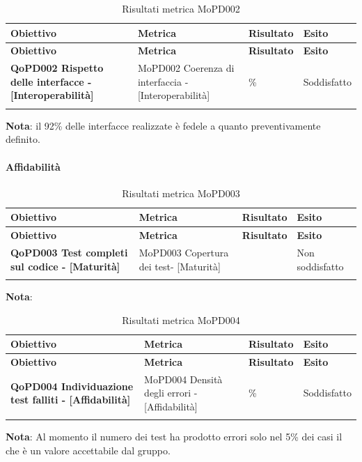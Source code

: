 \renewcommand{\arraystretch}{2} %
\begin{longtable}[H]{>{\centering\bfseries}m{5cm} >{\centering}m{5cm} >{\centering}m{2.5cm} >{\centering\arraybackslash}m{2.5cm}}  
  \rowcolor{lightgray}
  {\textbf{Obiettivo}} & {\textbf{Metrica}} & {\textbf{Risultato}} & {\textbf{Esito}}  \\
  \endfirsthead%
  \rowcolor{lightgray}
  {\textbf{Obiettivo}} & {\textbf{Metrica}} & {\textbf{Risultato}} & {\textbf{Esito}}  \\
  \endhead%
  \textbf{QoPD002 Rispetto delle interfacce - [Interoperabilità]} & MoPD002 Coerenza di interfaccia - [Interoperabilità] & 92\% & Soddisfatto \\
  \caption{Risultati metrica MoPD002}
  \label{tab:my-table}
\end{longtable}
\textbf{Nota}: il 92\% delle interfacce realizzate è fedele a quanto preventivamente definito.

\paragraph{Affidabilità}
\label{sub:affidabilita}

\renewcommand{\arraystretch}{2} %
\begin{longtable}[H]{>{\centering\bfseries}m{5cm} >{\centering}m{5cm} >{\centering}m{2.5cm} >{\centering\arraybackslash}m{2.5cm}}  
  \rowcolor{lightgray}
  {\textbf{Obiettivo}} & {\textbf{Metrica}} & {\textbf{Risultato}} & {\textbf{Esito}}  \\
  \endfirsthead%
  \rowcolor{lightgray}
  {\textbf{Obiettivo}} & {\textbf{Metrica}} & {\textbf{Risultato}} & {\textbf{Esito}}  \\
  \endhead%
  \textbf{QoPD003 Test completi sul codice - [Maturità]} & MoPD003 Copertura dei test- [Maturità] &  & Non soddisfatto \\
  \caption{Risultati metrica MoPD003}
  \label{tab:my-table}
\end{longtable}
\textbf{Nota}: 

\renewcommand{\arraystretch}{2} %
\begin{longtable}[H]{>{\centering\bfseries}m{5cm} >{\centering}m{5cm} >{\centering}m{2.5cm} >{\centering\arraybackslash}m{2.5cm}}  
  \rowcolor{lightgray}
  {\textbf{Obiettivo}} & {\textbf{Metrica}} & {\textbf{Risultato}} & {\textbf{Esito}}  \\
  \endfirsthead%
  \rowcolor{lightgray}
  {\textbf{Obiettivo}} & {\textbf{Metrica}} & {\textbf{Risultato}} & {\textbf{Esito}}  \\
  \endhead%
  \textbf{QoPD004 Individuazione test falliti - [Affidabilità]} & MoPD004 Densità degli errori - [Affidabilità] & 5\% & Soddisfatto \\
  \caption{Risultati metrica MoPD004}
  \label{tab:my-table}
\end{longtable}
\textbf{Nota}: Al momento il numero dei test ha prodotto errori solo nel 5\% dei casi il che è un valore accettabile dal gruppo.

